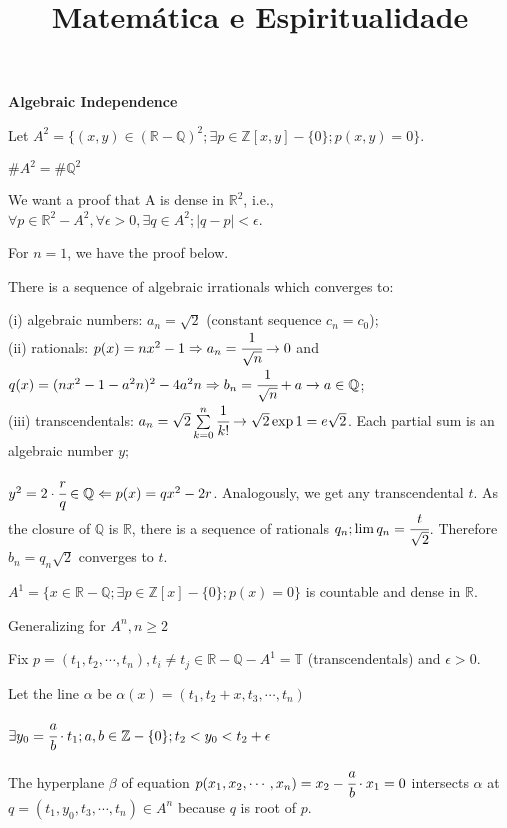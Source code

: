 \documentclass[10pt,a4paper]{article}
\title{Matem\'atica e Espiritualidade}
\date{}
\begin{document}
\textbf{Algebraic Independence}

\vspace{6mm}

Let $A^2 = \{(x,y) \in (\mathbb{R} - \mathbb{Q})^2; \exists p \in \mathbb{Z}[x, y] - \{0 \} ; p(x,y) = 0\}$.

$\# A^2 = \# \mathbb{Q}^2$

We want a proof that A is dense in $\mathbb{R}^2$, i.e., $\forall p \in \mathbb{R}^2 - A^2, \forall \epsilon > 0, \exists q \in A^2 ; |q - p| < \epsilon$.

For $n = 1$, we have the proof below.

There is a sequence of algebraic irrationals which converges to:

 (i) algebraic numbers: $a_n = \sqrt{2}$ (constant sequence $c_n = c_0$); \\
 
 (ii) rationals: $p(x) = nx^2 - 1 \Rightarrow a_n = \cfrac{1}{\sqrt{n}} \rightarrow 0$
 and $q(x) = (nx^2 -1 - a^2n)^2 - 4a^2n \Rightarrow b_n = \cfrac{1}{\sqrt{n}} + a \rightarrow a \in \mathbb{Q}$; \\
 
 (iii) transcendentals: $a_n = \sqrt{2} \sum\limits_{k = 0}^n \cfrac{1}{k!} \rightarrow \sqrt{2} \exp 1 = e \sqrt{2}$. Each partial sum is an algebraic number $y ;$ 
 
$ y^2 = 2 \cdot \cfrac{r}{q} \in \mathbb{Q} \Leftarrow p(x) = qx^2 - 2r$. Analogously, we get any transcendental $t$. As the closure of $\mathbb{Q}$ is $\mathbb{R}$, there is a sequence of rationals $q_n ; \lim q_n = \cfrac{t}{\sqrt{2}}$. Therefore $b_n = q_n \sqrt{2}$ converges to $t$.

$A^1 = \{x \in \mathbb{R} - \mathbb{Q}; \exists p \in \mathbb{Z}[x] - \{0 \} ; p(x) = 0\}$ is countable and dense in $\mathbb{R}$.

\vspace{6mm}

Generalizing for $A^n, n \ge 2$

Fix $p = (t_1, t_2, \cdots, t_n), t_i \neq t_j \in \mathbb{R} - \mathbb{Q} - A^1 = \mathbb{T}$ (transcendentals) and $\epsilon > 0$.

Let the line $\alpha$ be $\alpha(x) = (t_1, t_2 + x, t_3, \cdots, t_n)$

$\exists y_0 = \cfrac{a}{b} \cdot t_1 ; a, b \in \mathbb{Z} - \{0\} ; t_2 < y_0 < t_2 + \epsilon$

The hyperplane $\beta$ of equation $p(x_1, x_2, \cdots, x_n) = x_2 - \cfrac{a}{b} \cdot x_1 = 0$ intersects $\alpha$ at $q = (t_1, y_0, t_3, \cdots, t_n) \in A^n$ because $q$ is root of $p$.
\end{document}
